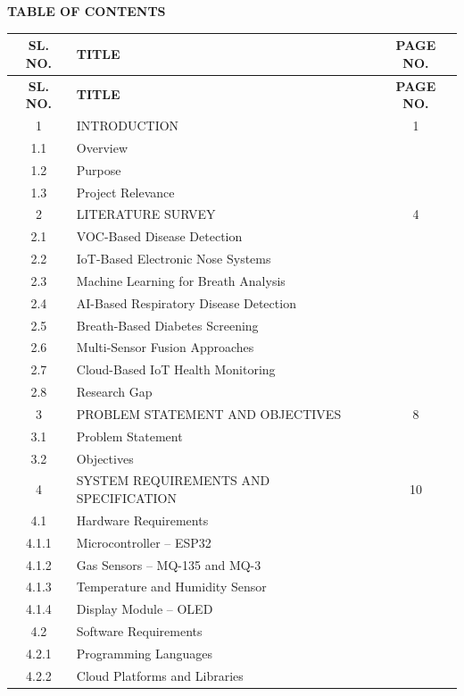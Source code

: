 \thispagestyle{empty}
\begin{center}
\textbf{\Large TABLE OF CONTENTS}\\[0.5cm]
\end{center}

\begin{longtable}{|c|p{9cm}|c|}
\hline
\textbf{SL. NO.} & \textbf{TITLE} & \textbf{PAGE NO.} \\
\hline
\endfirsthead
\hline
\textbf{SL. NO.} & \textbf{TITLE} & \textbf{PAGE NO.} \\
\hline
\endhead
1 & INTRODUCTION & 1 \\
1.1 & \quad Overview & \\
1.2 & \quad Purpose & \\
1.3 & \quad Project Relevance & \\
\hline
2 & LITERATURE SURVEY & 4 \\
2.1 & \quad VOC-Based Disease Detection & \\
2.2 & \quad IoT-Based Electronic Nose Systems & \\
2.3 & \quad Machine Learning for Breath Analysis & \\
2.4 & \quad AI-Based Respiratory Disease Detection & \\
2.5 & \quad Breath-Based Diabetes Screening & \\
2.6 & \quad Multi-Sensor Fusion Approaches & \\
2.7 & \quad Cloud-Based IoT Health Monitoring & \\
2.8 & \quad Research Gap & \\
\hline
3 & PROBLEM STATEMENT AND OBJECTIVES & 8 \\
3.1 & \quad Problem Statement & \\
3.2 & \quad Objectives & \\
\hline
4 & SYSTEM REQUIREMENTS AND SPECIFICATION & 10 \\
4.1 & \quad Hardware Requirements & \\
4.1.1 & \qquad Microcontroller -- ESP32 & \\
4.1.2 & \qquad Gas Sensors -- MQ-135 and MQ-3 & \\
4.1.3 & \qquad Temperature and Humidity Sensor & \\
4.1.4 & \qquad Display Module -- OLED & \\
4.2 & \quad Software Requirements & \\
4.2.1 & \qquad Programming Languages & \\
4.2.2 & \qquad Cloud Platforms and Libraries & \\

\end{longtable}
